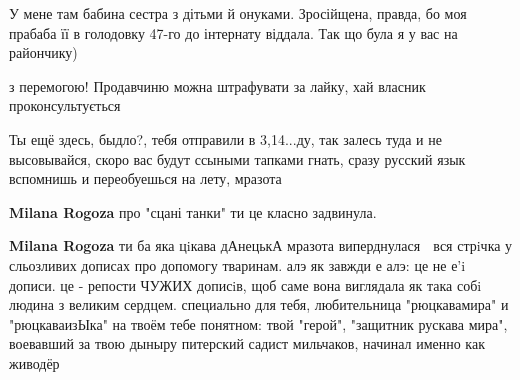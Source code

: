 \begin{itemize}
\begin{itemize}
У мене там бабина сестра з дітьми й онуками. Зросійщена, правда, бо моя прабаба
її в голодовку 47-го до інтернату віддала. Так що була я у вас на райончику)

\end{itemize}

 
з перемогою! Продавчиню можна штрафувати за лайку, хай власник проконсультується


Ты ещё здесь, быдло?, тебя отправили в 3,14...ду, так залесь туда и не
высовывайся, скоро вас будут ссыными тапками гнать, сразу русский язык
вспомнишь и переобуешься на лету, мразота

\begin{itemize}
 
\textbf{Milana Rogoza} про "сцані танки" ти це класно задвинула.

 
\textbf{Milana Rogoza} ти ба яка цiкава дАнецькА мразота виперднулася 🤔 вся
стрiчка у сльозливих дописах про допомогу тваринам. алэ як завжди е алэ: це не
е'i дописи. це - репости ЧУЖИХ дописiв, щоб саме вона виглядала як така собi
людина з великим сердцем. специально для тебя, любительница "рюцкавамира" и
"рюцкаваизЫка" на твоём тебе понятном: твой "герой", "защитник рускава мира",
воевавший за твою дыныру питерский садист мильчаков, начинал именно как живодёр
🤷

 

\end{itemize}
\end{itemize}
